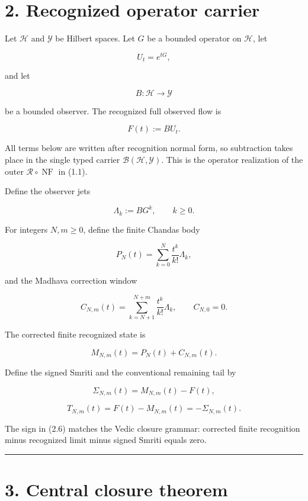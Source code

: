 \hypertarget{recognized-operator-carrier}{%
\section{2. Recognized operator carrier}\label{recognized-operator-carrier}}

Let \(\mathcal H\) and \(\mathcal Y\) be Hilbert spaces. Let \(G\) be a bounded
operator on \(\mathcal H\), let

\[
U_t=e^{tG},
\]

and let

\[
B:\mathcal H\to\mathcal Y
\]

be a bounded observer. The recognized full observed flow is

\[
\boxed{F(t):=BU_t.}
\tag{2.1}
\]

All terms below are written after recognition normal form, so subtraction takes
place in the single typed carrier \(\mathcal B(\mathcal H,\mathcal Y)\). This is
the operator realization of the outer \(\mathcal R\circ\operatorname{NF}\) in
(1.1).

Define the observer jets

\[
\Lambda_k:=BG^k,
\qquad k\ge0.
\tag{2.2}
\]

For integers \(N,m\ge0\), define the finite Chandas body

\[
\boxed{
P_N(t)=\sum_{k=0}^{N}\frac{t^k}{k!}\Lambda_k,
}
\tag{2.3}
\]

and the Madhava correction window

\[
\boxed{
C_{N,m}(t)
=\sum_{k=N+1}^{N+m}\frac{t^k}{k!}\Lambda_k,
\qquad C_{N,0}=0.
}
\tag{2.4}
\]

The corrected finite recognized state is

\[
\boxed{M_{N,m}(t)=P_N(t)+C_{N,m}(t).}
\tag{2.5}
\]

Define the signed Smriti and the conventional remaining tail by

\[
\boxed{
\Sigma_{N,m}(t)=M_{N,m}(t)-F(t),
}
\tag{2.6}
\]

\[
\boxed{
T_{N,m}(t)=F(t)-M_{N,m}(t)=-\Sigma_{N,m}(t).
}
\tag{2.7}
\]

The sign in (2.6) matches the Vedic closure grammar: corrected finite
recognition minus recognized limit minus signed Smriti equals zero.

\begin{center}\rule{0.5\linewidth}{0.5pt}\end{center}

\hypertarget{central-closure-theorem}{%
\section{3. Central closure theorem}\label{central-closure-theorem}}

